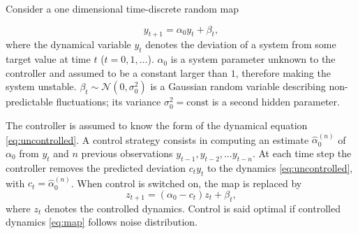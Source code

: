 \documentclass[FinalReport.tex]{subfiles}
\begin{document}
Consider a one dimensional time-discrete random map 

\begin{equation}\label{eq:uncontrolled}
	y_{t+1}=\alpha_0y_t + \beta_t,	
\end{equation}
where the dynamical variable $y_t$ denotes the deviation of a system from some target value at time $t$ ($t=0,1,\dots$). $\alpha_0$ is a system parameter unknown to the controller and assumed to be a constant larger than $1$, therefore making the system unstable. $\beta_t\sim\mathcal{N}(0,\sigma_0^2)$ is a Gaussian random variable describing non-predictable fluctuations; its variance $\sigma_0^2=\text{const}$ is a second hidden parameter.

The controller is assumed to know the form of the dynamical equation \eqref{eq:uncontrolled}. A control strategy consists in computing an estimate $\hat{\alpha}_0^{(n)}$ of $\alpha_0$ from $y_t$ and $n$ previous observations $y_{t-1},y_{t-2},\dots y_{t-n}$. At each time step the controller removes the predicted deviation $c_ty_t$ to the dynamics \eqref{eq:uncontrolled}, with $c_t=\hat{\alpha}_0^{(n)}$. When control is switched on, the map is replaced by
\begin{equation}\label{eq:map}
	z_{t+1}=(\alpha_0-c_t)z_t+\beta_t,	
\end{equation}
where $z_t$ denotes the controlled dynamics. Control is said optimal if controlled dynamics \eqref{eq:map} follows noise distribution.
\end{document}
